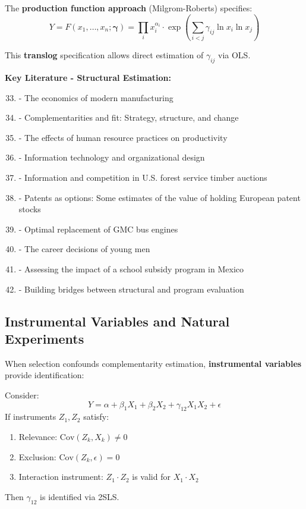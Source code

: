 The \textbf{production function approach} (Milgrom-Roberts) specifies:
\begin{equation}
Y = F(x_1, \ldots, x_n; \boldsymbol{\gamma}) = \prod_i x_i^{\alpha_i} \cdot \exp\left(\sum_{i<j} \gamma_{ij} \ln x_i \ln x_j\right)
\label{eq:translog}
\end{equation}

This \textbf{translog} specification allows direct estimation of $\gamma_{ij}$ via OLS.

\textbf{Key Literature - Structural Estimation:}
\begin{enumerate}[noitemsep]
    \setcounter{enumi}{32}
    \item \citet{milgrom1990b} - The economics of modern manufacturing
    \item \citet{milgrom1995} - Complementarities and fit: Strategy, structure, and change
    \item \citet{ichniowski1997} - The effects of human resource practices on productivity
    \item \citet{brynjolfsson2002} - Information technology and organizational design
    \item \citet{athey2001} - Information and competition in U.S. forest service timber auctions
    \item \citet{pakes1986} - Patents as options: Some estimates of the value of holding European patent stocks
    \item \citet{rust1987} - Optimal replacement of GMC bus engines
    \item \citet{keane1997} - The career decisions of young men
    \item \citet{todd2006} - Assessing the impact of a school subsidy program in Mexico
    \item \citet{heckman2010} - Building bridges between structural and program evaluation
\end{enumerate}

\subsection{Instrumental Variables and Natural Experiments}
\label{subsec:iv-methods}

When selection confounds complementarity estimation, \textbf{instrumental variables} provide identification:

\begin{theorem}
Consider:
\begin{equation}
Y = \alpha + \beta_1 X_1 + \beta_2 X_2 + \gamma_{12} X_1 X_2 + \epsilon
\end{equation}
If instruments $Z_1, Z_2$ satisfy:
\begin{enumerate}
    \item Relevance: $\text{Cov}(Z_k, X_k) \neq 0$
    \item Exclusion: $\text{Cov}(Z_k, \epsilon) = 0$
    \item Interaction instrument: $Z_1 \cdot Z_2$ is valid for $X_1 \cdot X_2$
\end{enumerate}
Then $\gamma_{12}$ is identified via 2SLS.
\end{theorem}

